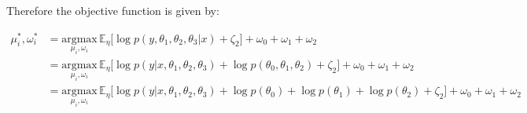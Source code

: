 \documentclass[10pt]{article}
\begin{document}
Therefore the objective function is given by:

\begin{align*}
  \mu_i^*, \omega_i^* &= \underset{\mu_i, \omega_i}{\text{argmax}}\,\mathbb{E}_\eta\big[\log p(y, \theta_1, \theta_2, \theta_3 | x) + \zeta_2 \big] + \omega_0 + \omega_1 + \omega_2 \\
  &= \underset{\mu_i, \omega_i}{\text{argmax}}\,\mathbb{E}_\eta\big[\log p(y |x, \theta_1, \theta_2, \theta_3) + \log p(\theta_0, \theta_1, \theta_2) + \zeta_2 \big] + \omega_0 + \omega_1 + \omega_2 \\
  &= \underset{\mu_i, \omega_i}{\text{argmax}}\,\mathbb{E}_\eta\big[\log p(y |x, \theta_1, \theta_2, \theta_3) + \log p(\theta_0) + \log p (\theta_1) + \log p(\theta_2) + \zeta_2 \big] + \omega_0 + \omega_1 + \omega_2
\end{align*}
\end{document}
